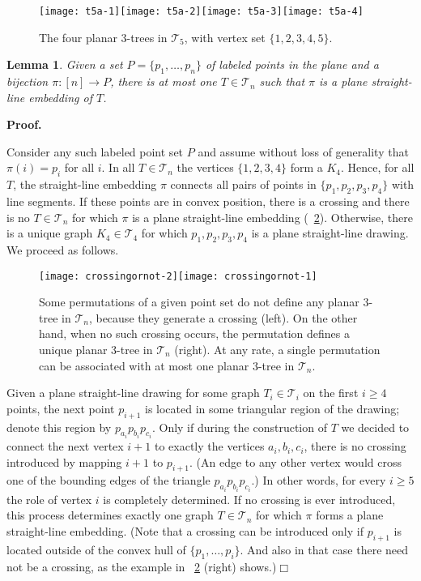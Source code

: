 \documentclass[11pt]{article}
\newtheorem{lemma}[equation]{Lemma}
\newcommand{\qed}{\hfill\ensuremath{\Box}}
\newenvironment{proof}{\noindent\textbf{Proof.}
}{\par\medskip}
\newcommand{\T}{\ensuremath{\mathcal T}}
\newcommand{\figscale}{1.1}
\begin{document}
\begin{figure}[htbp]
  \centering \texttt{[image: t5a-1]}\hfill \texttt{[image: t5a-2]}\hfill \texttt{[image: t5a-3]}\hfill \texttt{[image: t5a-4]}
  \caption{\label{fig:T5}The four planar 3-trees in $\T_5$, with vertex set $\{1,2,3,4,5\}$.}
\end{figure}

\begin{lemma}
  \label{lem:labeled_points_unique_stacked}
  Given a set $P=\{p_1,\dots,p_n\}$ of labeled points in the plane and a
  bijection $\pi: [n] \to P$, there is \emph{at most one} $T\in \T_n$ such that
  $\pi$ is a plane straight-line embedding of $T$.
\end{lemma}
\begin{proof}
  Consider any such labeled point set $P$ and assume without loss of
  generality that $\pi(i)=p_i$ for all $i$. In all $T\in\T_n$ the
  vertices $\{1,2,3,4\}$ form a $K_4$. Hence, for all $T$, the
  straight-line embedding $\pi$ connects all pairs of points in
  $\{p_1,p_2,p_3,p_4\}$ with line segments. If these points are in
  convex position, there is a crossing and there is no $T\in\T_n$ for
  which $\pi$ is a plane straight-line embedding
  (\figurename~\ref{fig:crossingornot}). Otherwise, there is a unique
  graph $K_4\in\T_4$ for which $p_1,p_2,p_3,p_4$ is a plane
  straight-line drawing. We proceed as follows.

  \begin{figure}[htbp]
\hfil \texttt{[image: crossingornot-2]}\hfil \texttt{[image: crossingornot-1]}\hfil \caption{\label{fig:crossingornot}Some permutations of a given point set do
      not define any planar 3-tree in $\T_n$, because they generate a crossing
      (left). On the other hand, when no such crossing occurs, the permutation
      defines a unique planar 3-tree in $\T_n$ (right). At any rate, a single
      permutation can be associated with at most one planar 3-tree in $\T_n$.}
  \end{figure}

  Given a plane straight-line drawing for some graph $T_i\in\T_i$ on the first
  $i\ge 4$ points, the next point $p_{i+1}$ is located in some triangular
  region of the drawing; denote this region by $p_{a_i}p_{b_i}p_{c_i}$. Only if
  during the construction of $T$ we decided to connect the next vertex $i+1$ to
  exactly the vertices $a_i,b_i,c_i$, there is no crossing introduced by
  mapping $i+1$ to $p_{i+1}$. (An edge to any other vertex would cross one of
  the bounding edges of the triangle $p_{a_i}p_{b_i}p_{c_i}$.) In other words,
  for every $i\ge 5$ the role of vertex $i$ is completely determined. If no
  crossing is ever introduced, this process determines exactly one graph
  $T\in\T_n$ for which $\pi$ forms a plane straight-line embedding. (Note that
  a crossing can be introduced only if $p_{i+1}$ is located outside of the
  convex hull of $\{p_1,\ldots,p_i\}$. And also in that case there need not be
  a crossing, as the example in \figurename~\ref{fig:crossingornot} (right)
  shows.)\qed
\end{proof}
\end{document}
